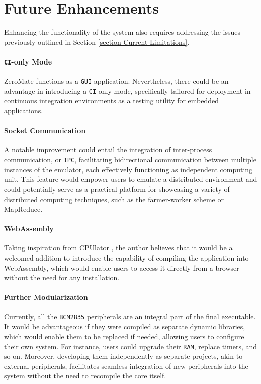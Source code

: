 \documentclass[english, ing, kiv, he, iso690numb, pdf]{fasthesis}
\begin{document}
	\section{Future Enhancements}
	
	Enhancing the functionality of the system also requires addressing the issues previously outlined in Section \ref{section-Current-Limitations}.
	
	\paragraph{\texttt{CI}-only Mode}
	
	ZeroMate functions as a \texttt{GUI} application. Nevertheless, there could be an advantage in introducing a \texttt{CI}-only mode, specifically tailored for deployment in continuous integration environments as a testing utility for embedded applications.
	
	\paragraph{Socket Communication}
	
	A notable improvement could entail the integration of inter-process communication, or \texttt{IPC}, facilitating bidirectional communication between multiple instances of the emulator, each effectively functioning as independent computing unit. This feature would empower users to emulate a distributed environment and could potentially serve as a practical platform for showcasing a variety of distributed computing techniques, such as the farmer-worker scheme or MapReduce.
	
	\paragraph{WebAssembly}
	
	Taking inspiration from CPUlator \cite{CPUlator}, the author believes that it would be a welcomed addition to introduce the capability of compiling the application into WebAssembly, which would enable users to access it directly from a browser without the need for any installation.
	
	\paragraph{Further Modularization}
	
	Currently, all the \texttt{BCM2835} peripherals are an integral part of the final executable. It would be advantageous if they were compiled as separate dynamic libraries, which would enable them to be replaced if needed, allowing users to configure their own system. For instance, users could upgrade their \texttt{RAM}, replace timers, and so on. Moreover, developing them independently as separate projects, akin to external peripherals, facilitates seamless integration of new peripherals into the system without the need to recompile the core itself.
	
\end{document}
